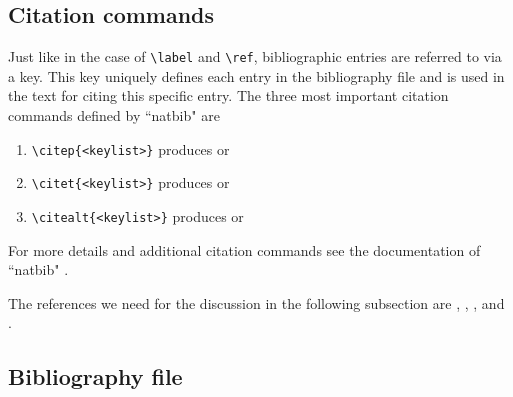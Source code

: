 \documentclass[a4paper,twoside]{article}
\begin{document}
\subsection{Citation commands}
\label{sec:5.2}

Just like in the case of \verb|\label| and \verb|\ref|, bibliographic entries are referred to via a key. This key uniquely defines each entry in the bibliography file and is used in the text for citing this specific entry. The three most important citation commands defined by ``natbib" are
\begin{enumerate}
  \item \verb|\citep{<keylist>}| produces \citep{article} or \citep{article,book,techreport}
  \item \verb|\citet{<keylist>}| produces \citet{article} or \citet{article,book,techreport}
  \item \verb|\citealt{<keylist>}| produces \citealt{article} or \citealt{article,book,techreport}
\end{enumerate}
For more details and additional citation commands see the documentation of ``natbib" \citep{natbib}.

The references we need for the discussion in the following subsection are \citet{article}, \citet{book}, \citet{incollection}, and \citet{techreport}.


\subsection{Bibliography file}
\label{sec:5.3}
\end{document}
